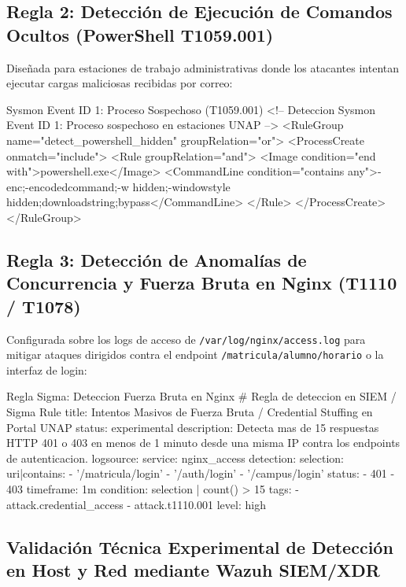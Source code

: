 \newpage
\enlargethispage{1.5\baselineskip}
\subsection*{Regla 2: Detección de Ejecución de Comandos Ocultos (PowerShell T1059.001)}
Diseñada para estaciones de trabajo administrativas donde los atacantes intentan ejecutar cargas maliciosas recibidas por correo:

\begin{cmdbox}{Sysmon Event ID 1: Proceso Sospechoso (T1059.001)}
<!-- Deteccion Sysmon Event ID 1: Proceso sospechoso en estaciones UNAP -->
<RuleGroup name="detect_powershell_hidden" groupRelation="or">
  <ProcessCreate onmatch="include">
    <Rule groupRelation="and">
      <Image condition="end with">powershell.exe</Image>
      <CommandLine condition="contains any">-enc;-encodedcommand;-w hidden;-windowstyle hidden;downloadstring;bypass</CommandLine>
    </Rule>
  </ProcessCreate>
</RuleGroup>
\end{cmdbox}

\subsection*{Regla 3: Detección de Anomalías de Concurrencia y Fuerza Bruta en Nginx (T1110 / T1078)}
Configurada sobre los logs de acceso de \texttt{/var/log/nginx/access.log} para mitigar ataques dirigidos contra el endpoint \texttt{/matricula/alumno/horario} o la interfaz de login:

\begin{cmdbox}{Regla Sigma: Deteccion Fuerza Bruta en Nginx}
# Regla de deteccion en SIEM / Sigma Rule
title: Intentos Masivos de Fuerza Bruta / Credential Stuffing en Portal UNAP
status: experimental
description: Detecta mas de 15 respuestas HTTP 401 o 403 en menos de 1 minuto desde una misma IP contra los endpoints de autenticacion.
logsource:
  service: nginx_access
detection:
  selection:
    uri|contains:
      - '/matricula/login'
      - '/auth/login'
      - '/campus/login'
    status:
      - 401
      - 403
  timeframe: 1m
  condition: selection | count() > 15
tags:
  - attack.credential_access
  - attack.t1110.001
level: high
\end{cmdbox}

\newpage
\subsection{Validación Técnica Experimental de Detección en Host y Red mediante Wazuh SIEM/XDR}\label{subsec:wazuh_validation}

